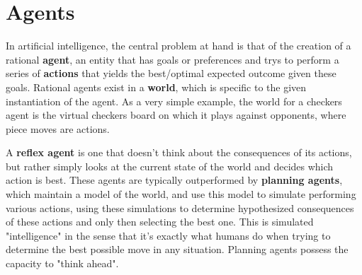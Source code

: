 \documentclass[11pt,fleqn]{article}
\def\title{Note \the\lecturenumber}
\begin{document}
\maketitle

\section*{Agents}

In artificial intelligence, the central problem at hand is that of the creation of a rational \textbf{agent}, an entity that has goals or preferences and trys to perform a series of \textbf{actions} that yields the best/optimal expected outcome given these goals. Rational agents exist in a \textbf{world}, which is specific to the given instantiation of the agent. As a very simple example, the world for a checkers agent is the virtual checkers board on which it plays against opponents, where piece moves are actions. 

A \textbf{reflex agent} is one that doesn't think about the consequences of its actions, but rather simply looks at the current state of the world and decides which action is best. These agents are typically outperformed by \textbf{planning agents}, which maintain a model of the world, and use this model to simulate performing various actions, using these simulations to determine hypothesized consequences of these actions and only then selecting the best one. This is simulated "intelligence" in the sense that it's exactly what humans do when trying to determine the best possible move in any situation. Planning agents possess the capacity to "think ahead".


\end{document}
\end{document}
